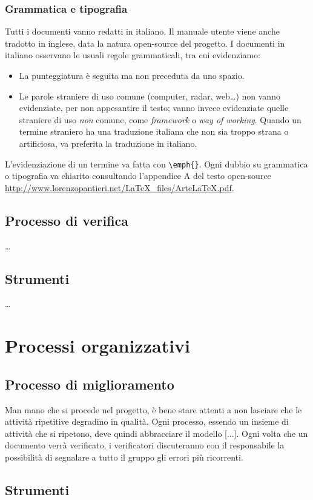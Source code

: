 \subsubsection{Grammatica e tipografia} Tutti i documenti vanno redatti in italiano. Il manuale utente viene anche tradotto in inglese, data la natura open-source del progetto. I documenti in italiano osservano le usuali regole grammaticali, tra cui evidenziamo:
\begin{itemize}
	\item La punteggiatura è seguita ma non preceduta da uno spazio.
	\item Le parole straniere di uso comune (computer, radar, web\dots) non vanno evidenziate, per non appesantire il testo; vanno invece evidenziate quelle straniere di uso \emph{non} comune, come \emph{framework} o \emph{way of working}. Quando un termine straniero ha una traduzione italiana che non sia troppo strana o artificiosa, va preferita la traduzione in italiano.
\end{itemize}
L'evidenziazione di un termine va fatta con \texttt{\textbackslash emph\{\}}. Ogni dubbio su grammatica o tipografia va chiarito consultando l'appendice A del testo open-source \url{http://www.lorenzopantieri.net/LaTeX_files/ArteLaTeX.pdf}.



\subsection{Processo di verifica} \dots

\subsection{Strumenti} \dots

\section{Processi organizzativi}

\subsection{Processo di miglioramento} %
Man mano che si procede nel progetto, è bene stare attenti a non lasciare che le attività ripetitive degradino in qualità. Ogni processo, essendo un insieme di attività che si ripetono, deve quindi abbracciare il modello  [...]. Ogni volta che un documento verrà verificato, i verificatori discuteranno con il responsabile la possibilità di segnalare a tutto il gruppo gli errori più ricorrenti.

\subsection{Strumenti}


